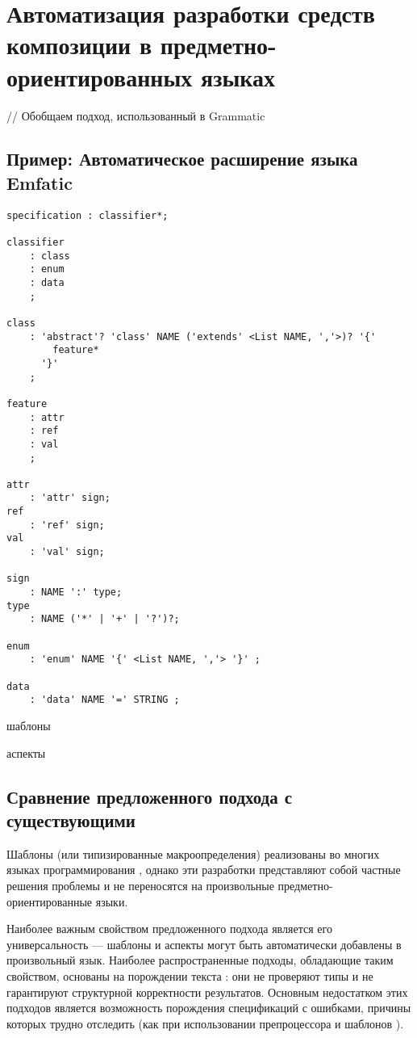 \part{Автоматизация разработки средств композиции в предметно-ориентированных языках}\label{part4}

// Обобщаем подход, использованный в Grammatic





\chapter{Пример: Автоматическое расширение языка Emfatic}

\begin{lstlisting}
specification : classifier*;

classifier
	: class
	: enum
	: data
	;
	
class
	: 'abstract'? 'class' NAME ('extends' <List NAME, ','>)? '{'
		feature*
	  '}'
	;
	
feature
	: attr
	: ref
	: val
	;
	
attr
	: 'attr' sign;
ref
	: 'ref' sign;
val
	: 'val' sign;
	
sign
	: NAME ':' type;
type
	: NAME ('*' | '+' | '?')?;

enum
	: 'enum' NAME '{' <List NAME, ','> '}' ;
	
data
	: 'data' NAME '=' STRING ;
\end{lstlisting}

шаблоны

аспекты

\chapter{Сравнение предложенного подхода с существующими}

Шаблоны (или типизированные макроопределения) реализованы во многих языках программирования \cite{???}, однако эти разработки представляют собой частные решения проблемы и не переносятся на произвольные предметно-ориентированные языки.

Наиболее важным свойством предложенного подхода является его универсальность --- шаблоны и аспекты могут быть автоматически добавлены в произвольный язык. Наиболее распространенные подходы, обладающие таким свойством, основаны на порождении текста \cite{???}: они не проверяют типы и не гарантируют структурной корректности результатов. Основным недостатком этих подходов является возможность порождения спецификаций с ошибками, причины которых трудно отследить (как при использовании препроцессора  и шаблонов ).

